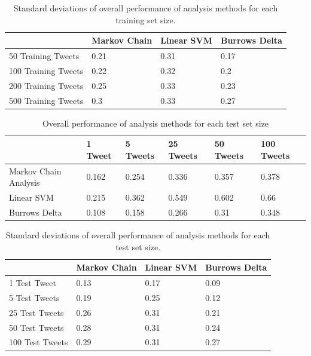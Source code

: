 \documentclass[pageno]{jpaper}
\begin{document}
\begin{table}[h]
\centering
\begin{tabular}{|l|l|l|l|}
\hline
                    & Markov Chain & Linear SVM & Burrows Delta \\ \hline
50 Training Tweets  & 0.21         & 0.31       & 0.17          \\ \hline
100 Training Tweets & 0.22         & 0.32       & 0.2           \\ \hline
200 Training Tweets & 0.25         & 0.33       & 0.23          \\ \hline
500 Training Tweets & 0.3          & 0.33       & 0.27          \\ \hline
\end{tabular}
\caption{Standard deviations of overall performance of analysis methods for each training set size.}
\label{trainingStdDev}
\end{table}

\begin{table}[h!]
\centering
\begin{tabular}{|l|l|l|l|l|l|}
\hline
                      & 1 Tweet   & 5 Tweets   & 25 Tweets  & 50 Tweets & 100 Tweets\\ \hline
Markov Chain Analysis & 0.162 & 0.254 & 0.336 & 0.357 & 0.378    \\ \hline
Linear SVM            & 0.215 & 0.362 & 0.549 & 0.602 & 0.66    \\ \hline
Burrows Delta         & 0.108 & 0.158 & 0.266 & 0.31 & 0.348  \\ \hline
\end{tabular}
\caption{Overall performance of analysis methods for each test set size}
\label{OverallChangeTest}
\end{table}

\begin{table}[h]
\centering
\begin{tabular}{|l|l|l|l|}
\hline
                & Markov Chain & Linear SVM & Burrows Delta \\ \hline
1 Test Tweet   & 0.13         & 0.17       & 0.09          \\ \hline
5 Test Tweets   & 0.19         & 0.25       & 0.12          \\ \hline
25 Test Tweets  & 0.26         & 0.31       & 0.21          \\ \hline
50 Test Tweets  & 0.28         & 0.31       & 0.24          \\ \hline
100 Test Tweets & 0.29         & 0.31       & 0.27          \\ \hline
\end{tabular}
\caption{Standard deviations of overall performance of analysis methods for each test set size.}
\label{testStdDev}
\end{table}
\end{document}
